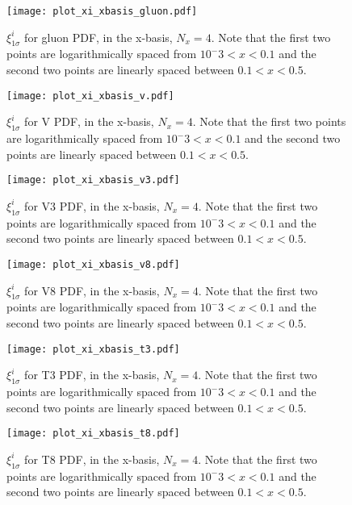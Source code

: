 \begin{figure}
    \centering
    \texttt{[image: plot\_xi\_xbasis\_gluon.pdf]}
    \caption{
        $\xi^{i}_{1\sigma}$ for gluon PDF, in the x-basis, $N_x=4$. Note that
        the first two points are logarithmically spaced from $10^-3 < x < 0.1$
        and the second two points are linearly spaced between $0.1 < x < 0.5$.
    }
    \label{fig:pdfxigluon}
\end{figure}

\begin{figure}
    \centering
    \texttt{[image: plot\_xi\_xbasis\_v.pdf]}
    \caption{
        $\xi^{i}_{1\sigma}$ for V PDF, in the x-basis, $N_x=4$. Note that
        the first two points are logarithmically spaced from $10^-3 < x < 0.1$
        and the second two points are linearly spaced between $0.1 < x < 0.5$.
    }
    \label{fig:pdfxiv}
\end{figure}

\begin{figure}
    \centering
    \texttt{[image: plot\_xi\_xbasis\_v3.pdf]}
    \caption{
        $\xi^{i}_{1\sigma}$ for V3 PDF, in the x-basis, $N_x=4$. Note that
        the first two points are logarithmically spaced from $10^-3 < x < 0.1$
        and the second two points are linearly spaced between $0.1 < x < 0.5$.
    }
    \label{fig:pdfxiv3}
\end{figure}

\begin{figure}
    \centering
    \texttt{[image: plot\_xi\_xbasis\_v8.pdf]}
    \caption{
        $\xi^{i}_{1\sigma}$ for V8 PDF, in the x-basis, $N_x=4$. Note that
        the first two points are logarithmically spaced from $10^-3 < x < 0.1$
        and the second two points are linearly spaced between $0.1 < x < 0.5$.
    }
    \label{fig:pdfxiv8}
\end{figure}

\begin{figure}
    \centering
    \texttt{[image: plot\_xi\_xbasis\_t3.pdf]}
    \caption{
        $\xi^{i}_{1\sigma}$ for T3 PDF, in the x-basis, $N_x=4$. Note that
        the first two points are logarithmically spaced from $10^-3 < x < 0.1$
        and the second two points are linearly spaced between $0.1 < x < 0.5$.
    }
    \label{fig:pdfxit3}
\end{figure}

\begin{figure}
    \centering
    \texttt{[image: plot\_xi\_xbasis\_t8.pdf]}
    \caption{
        $\xi^{i}_{1\sigma}$ for T8 PDF, in the x-basis, $N_x=4$. Note that
        the first two points are logarithmically spaced from $10^-3 < x < 0.1$
        and the second two points are linearly spaced between $0.1 < x < 0.5$.
    }
    \label{fig:pdfxit8}
\end{figure}

